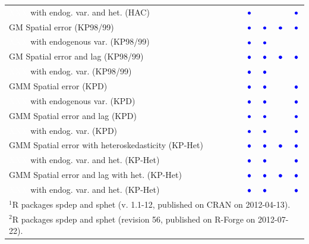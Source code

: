 \documentclass{article}
\begin{document}
\begin{table}[htpb]
\begin{small}
\begin{tabular}{l|cccc}
\textcolor{white}{XXX} with endog. var. and het. (HAC) &{\LARGE$\textcolor{blue}\bullet$}&&&{\LARGE$\textcolor{blue}\bullet$}\\
GM Spatial error (KP98/99)&{\LARGE$\textcolor{blue}\bullet$}&{\LARGE$\textcolor{blue}\bullet$}&{\LARGE$\textcolor{blue}\bullet$}&{\LARGE$\textcolor{blue}\bullet$}\\
\textcolor{white}{XXX} with endogenous var. (KP98/99)&{\LARGE$\textcolor{blue}\bullet$}&{\LARGE$\textcolor{blue}\bullet$}&&\\
GM Spatial error and lag (KP98/99)&{\LARGE$\textcolor{blue}\bullet$}&{\LARGE$\textcolor{blue}\bullet$}&{\LARGE$\textcolor{blue}\bullet$}&{\LARGE$\textcolor{blue}\bullet$}\\
\textcolor{white} {XXX} with endog. var. (KP98/99)&{\LARGE$\textcolor{blue}\bullet$}&{\LARGE$\textcolor{blue}\bullet$}&&\\
GMM Spatial error (KPD)&{\LARGE$\textcolor{blue}\bullet$}&{\LARGE$\textcolor{blue}\bullet$}&&{\LARGE$\textcolor{blue}\bullet$}\\
\textcolor{white}{XXX} with endogenous var. (KPD)&{\LARGE$\textcolor{blue}\bullet$}&{\LARGE$\textcolor{blue}\bullet$}&&{\LARGE$\textcolor{blue}\bullet$}\\
GMM Spatial error and lag (KPD)&{\LARGE$\textcolor{blue}\bullet$}&{\LARGE$\textcolor{blue}\bullet$}&&{\LARGE$\textcolor{blue}\bullet$}\\
\textcolor{white}{XXX} with endog. var. (KPD)&{\LARGE$\textcolor{blue}\bullet$}&{\LARGE$\textcolor{blue}\bullet$}&&{\LARGE$\textcolor{blue}\bullet$}\\
GMM Spatial error with heteroskedasticity (KP-Het)&{\LARGE$\textcolor{blue}\bullet$}&{\LARGE$\textcolor{blue}\bullet$}&{\LARGE$\textcolor{blue}\bullet$}&{\LARGE$\textcolor{blue}\bullet$}\\
\textcolor{white}{XXX} with endog. var. and het. (KP-Het)&{\LARGE$\textcolor{blue}\bullet$}&{\LARGE$\textcolor{blue}\bullet$}&&{\LARGE$\textcolor{blue}\bullet$}\\
GMM Spatial error and lag with het. (KP-Het)&{\LARGE$\textcolor{blue}\bullet$}&{\LARGE$\textcolor{blue}\bullet$}&{\LARGE$\textcolor{blue}\bullet$}&{\LARGE$\textcolor{blue}\bullet$}\\
\textcolor{white}{XXX} with endog. var. and het. (KP-Het)&{\LARGE$\textcolor{blue}\bullet$}&{\LARGE$\textcolor{blue}\bullet$}&&{\LARGE$\textcolor{blue}\bullet$}\\
\hline
\multicolumn{5}{l}{\scriptsize{$^1$R packages spdep and sphet (v. 1.1-12, published on CRAN on 2012-04-13).}} \\
\multicolumn{5}{l}{\scriptsize{$^2$R packages spdep and sphet (revision 56, published on R-Forge on 2012-07-22).}} \\
\end{tabular}
\end{small}
\end{table}
\end{document}
